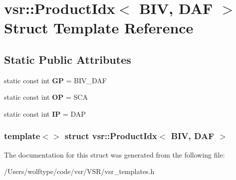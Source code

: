 \hypertarget{structvsr_1_1_product_idx_3_01_b_i_v_00_01_d_a_f_01_4}{\section{vsr\-:\-:Product\-Idx$<$ B\-I\-V, D\-A\-F $>$ Struct Template Reference}
\label{structvsr_1_1_product_idx_3_01_b_i_v_00_01_d_a_f_01_4}
}
\subsection*{Static Public Attributes}
\begin{DoxyCompactItemize}
\item 
\hypertarget{structvsr_1_1_product_idx_3_01_b_i_v_00_01_d_a_f_01_4_a99751e9ab3c7cdce9895b96e510c17ee}{static const int {\bfseries G\-P} = B\-I\-V\-\_\-\-D\-A\-F}\label{structvsr_1_1_product_idx_3_01_b_i_v_00_01_d_a_f_01_4_a99751e9ab3c7cdce9895b96e510c17ee}

\item 
\hypertarget{structvsr_1_1_product_idx_3_01_b_i_v_00_01_d_a_f_01_4_aed619a9b99a4ded5bf1793e71d5925e3}{static const int {\bfseries O\-P} = S\-C\-A}\label{structvsr_1_1_product_idx_3_01_b_i_v_00_01_d_a_f_01_4_aed619a9b99a4ded5bf1793e71d5925e3}

\item 
\hypertarget{structvsr_1_1_product_idx_3_01_b_i_v_00_01_d_a_f_01_4_a9baa569e3bb5a26accad48c698320edd}{static const int {\bfseries I\-P} = D\-A\-P}\label{structvsr_1_1_product_idx_3_01_b_i_v_00_01_d_a_f_01_4_a9baa569e3bb5a26accad48c698320edd}

\end{DoxyCompactItemize}
\subsubsection*{template$<$$>$ struct vsr\-::\-Product\-Idx$<$ B\-I\-V, D\-A\-F $>$}



The documentation for this struct was generated from the following file\-:\begin{DoxyCompactItemize}
\item 
/\-Users/wolftype/code/vsr/\-V\-S\-R/vsr\-\_\-templates.\-h\end{DoxyCompactItemize}

